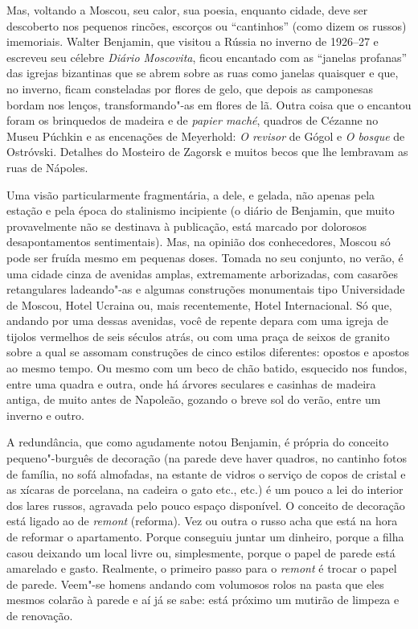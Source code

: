 Mas, voltando a Moscou, seu calor, sua poesia, enquanto cidade, deve ser
descoberto nos pequenos rincões, escorços ou ``cantinhos'' (como dizem
os russos) imemoriais. Walter Benjamin, que visitou a Rússia no inverno
de 1926--27 e escreveu seu célebre \emph{Diário Moscovita}, ficou
encantado com as ``janelas profanas'' das igrejas bizantinas que se
abrem sobre as ruas como janelas quaisquer e que, no inverno, ficam
consteladas por flores de gelo, que depois as camponesas bordam nos
lenços, transformando"-as em flores de lã. Outra coisa que o encantou
foram os brinquedos de madeira e de \emph{papier maché}, quadros de
Cézanne no Museu Púchkin e as encenações de Meyerhold: \emph{O revisor}
de Gógol e \emph{O bosque} de Ostróvski. Detalhes do Mosteiro de Zagorsk
e muitos becos que lhe lembravam as ruas de Nápoles.

Uma visão particularmente fragmentária, a dele, e gelada, não apenas
pela estação e pela época do stalinismo incipiente (o diário de
Benjamin, que muito provavelmente não se destinava à publicação, está
marcado por dolorosos desapontamentos sentimentais). Mas, na opinião dos
conhecedores, Moscou só pode ser fruída mesmo em pequenas doses. Tomada
no seu conjunto, no verão, é uma cidade cinza de avenidas amplas,
extremamente arborizadas, com casarões retangulares ladeando"-as e
algumas construções monumentais tipo Universidade de Moscou, Hotel
Ucraina ou, mais recentemente, Hotel Internacional. Só que, andando por
uma dessas avenidas, você de repente depara com uma igreja de tijolos
vermelhos de seis séculos atrás, ou com uma praça de seixos de granito
sobre a qual se assomam construções de cinco estilos diferentes: opostos
e apostos ao mesmo tempo. Ou mesmo com um beco de chão batido, esquecido
nos fundos, entre uma quadra e outra, onde há árvores seculares e
casinhas de madeira antiga, de muito antes de Napoleão, gozando o breve
sol do verão, entre um inverno e outro.

A redundância, que como agudamente notou Benjamin, é própria do conceito
pequeno"-burguês de decoração (na parede deve haver quadros, no cantinho
fotos de família, no sofá almofadas, na estante de vidros o serviço de
copos de cristal e as xícaras de porcelana, na cadeira o gato etc., etc.)
é um pouco a lei do interior dos lares russos, agravada pelo pouco
espaço disponível. O conceito de decoração está ligado ao de
\emph{remont} (reforma). Vez ou outra o russo acha que está na hora de
reformar o apartamento. Porque conseguiu juntar um dinheiro, porque a
filha casou deixando um local livre ou, simplesmente, porque o papel de
parede está amarelado e gasto. Realmente, o primeiro passo para o
\emph{remont} é trocar o papel de parede. Veem"-se homens andando com
volumosos rolos na pasta que eles mesmos colarão à parede e aí já se
sabe: está próximo um mutirão de limpeza e de renovação.

